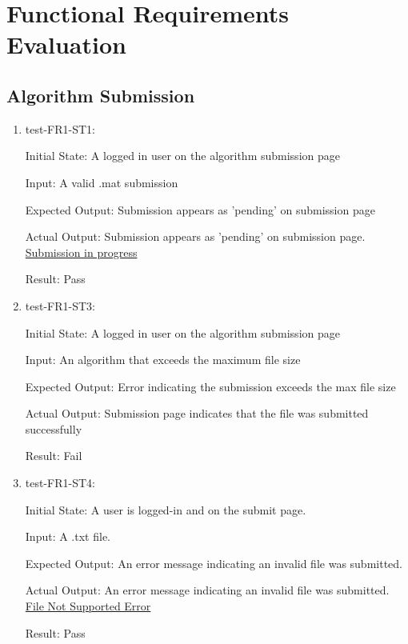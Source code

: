 \documentclass[12pt, titlepage]{article}
\begin{document}
\section{Functional Requirements Evaluation}
\subsection{Algorithm Submission}
\begin{enumerate}
    \item test-FR1-ST1:\label{test-FR1-ST1}
    
    Initial State: A logged in user on the algorithm submission page
    
    Input: A valid .mat submission
    
    Expected Output: Submission appears as 'pending' on submission page
    
    Actual Output: Submission appears as 'pending' on submission page. \href{https://github.com/AidanMariglia/SOCAlgoTestPlatform/blob/main/docs/VnVReport/images/submission_pending.png}{Submission in progress}
    
    Result: Pass

    \item test-FR1-ST3:\label{test-FR1-ST3}
    
    Initial State: A logged in user on the algorithm submission page
    
    Input: An algorithm that exceeds the maximum file size
    
    Expected Output: Error indicating the submission exceeds the max file size
    
    Actual Output: Submission page indicates that the file was submitted successfully 
    
    Result: Fail
     \item test-FR1-ST4:\label{test-FR1-ST4}
    
    Initial State: A user is logged-in and on the submit page.
    
    Input: A .txt file.
    
    Expected Output: An error message indicating an invalid file was submitted.
    
    Actual Output: An error message indicating an invalid file was submitted. \href{https://github.com/AidanMariglia/SOCAlgoTestPlatform/blob/main/docs/VnVReport/images/Invalid_file.png}{File Not Supported Error}
    
    Result: Pass
\end{enumerate}
\end{document}
